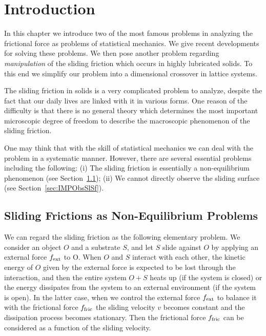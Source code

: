 \chapter{Introduction}
In this chapter we introduce two of the most famous problems in analyzing the frictional force as problems of statistical mechanics. We give recent developments for solving these problems. We then pose another problem regarding \textit{manipulation} of the sliding friction which occurs in highly lubricated solids. To this end we simplify our problem into a dimensional crossover in lattice systems.

The sliding friction in solids is a very complicated problem to analyze, despite the fact that our daily lives are linked with it in various forms. One reason of the difficulty is that there is no general theory which determines the most important microscopic degree of freedom to describe the macroscopic phenomenon of the sliding friction.

One may think that with the skill of statistical mechanics we can deal with the problem in a systematic manner. However, there are several essential problems including the following: (i) The sliding friction is essentially a non-equilibrium phenomenon (see Section~\ref{sec:NESliding}); (ii) We cannot directly observe the sliding surface (see Section~\ref{sec:IMPObsSlSf}).

\section{Sliding Frictions as Non-Equilibrium Problems}\label{sec:NESliding}
We can regard the sliding friction as the following elementary problem. We consider an object $O$ and a substrate $S$, and let $S$ slide against $O$ by applying an external force $f_{\rm ext}$ to O. When $O$ and $S$ interact with each other, the kinetic energy of $O$ given by the external force is expected to be lost through the interaction, and then the entire system $O+S$ heats up (if the system is closed) or the energy dissipates from the system to an external environment (if the system is open). In the latter case, when we control the external force $f_{\rm ext}$ to balance it with the frictional force $f_{\rm fric}$ the sliding velocity $v$ becomes constant and the dissipation process becomes stationary. Then the frictional force $f_{\rm fric}$ can be considered as a function of the sliding velocity.

